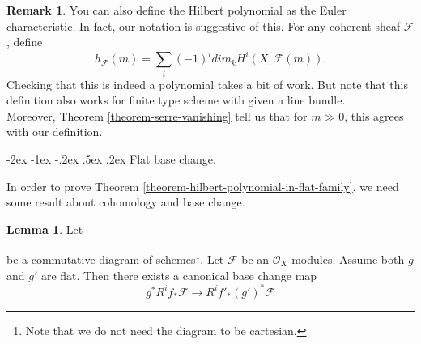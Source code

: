 \documentclass[11pt]{amsart}
\makeatletter
\renewcommand\subsection{\@startsection {subsection}{1}{\z@}%
	{-2ex \@plus -1ex \@minus -.2ex}%
	{.5ex \@plus.2ex}%
	{\normalfont\bfseries}}
\newcommand{\sF}{{\mathcal F}}
\theoremstyle{definition}
\newtheorem{lemma}[theorem]{Lemma}
\newtheorem{remark}[theorem]{Remark}
\makeatother
\begin{document}
\begin{remark}
	You can also define the Hilbert polynomial as the Euler characteristic. In fact, our notation is suggestive of this. For any coherent sheaf $\sF$, define
	\[h_{\sF}(m)= \sum_i (-1)^i dim_k H^i(X,\sF(m)).\]
	Checking that this is indeed a polynomial takes a bit of work. But note that this definition also works for finite type scheme with given a line bundle.\\
	Moreover, Theorem \ref{theorem-serre-vanishing} tell us that for $m\gg 0$, this agrees with our definition.
\end{remark}


\subsection{Flat base change.}

In order to prove Theorem \ref{theorem-hilbert-polynomial-in-flat-family}, we need some result about cohomology and base change.

\begin{lemma}
	\label{lemma-base-change-map-flat-case}
	Let
	\begin{center}
	\end{center}
	be a commutative diagram of schemes\footnote{Note that we do not need the diagram to be cartesian.}.
	Let $\mathcal{F}$ be an	$\mathcal{O}_X$-modules.
	Assume both $g$ and $g'$ are flat.
	Then there exists a canonical base change map
	\[
	g^*R^if_*\mathcal{F}
	\longrightarrow
	R^if'_*(g')^*\mathcal{F}\]
\end{lemma}
\end{document}
